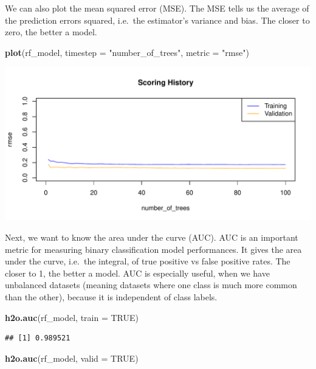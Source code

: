 \documentclass[]{article}
\newenvironment{Shaded}{\begin{snugshade}}{\end{snugshade}}
\newcommand{\KeywordTok}[1]{\textcolor[rgb]{0.13,0.29,0.53}{\textbf{{#1}}}}
\newcommand{\DataTypeTok}[1]{\textcolor[rgb]{0.13,0.29,0.53}{{#1}}}
\newcommand{\StringTok}[1]{\textcolor[rgb]{0.31,0.60,0.02}{{#1}}}
\newcommand{\OtherTok}[1]{\textcolor[rgb]{0.56,0.35,0.01}{{#1}}}
\newcommand{\NormalTok}[1]{{#1}}
\begin{document}
We can also plot the mean squared error (MSE). The MSE tells us the
average of the prediction errors squared, i.e.~the estimator's variance
and bias. The closer to zero, the better a model.

\begin{Shaded}
\begin{Highlighting}[]
\KeywordTok{plot}\NormalTok{(rf_model,}
     \DataTypeTok{timestep =} \StringTok{"number_of_trees"}\NormalTok{,}
     \DataTypeTok{metric =} \StringTok{"rmse"}\NormalTok{)}
\end{Highlighting}
\end{Shaded}

\begin{center}\includegraphics{webinar_code_files/figure-latex/unnamed-chunk-48-1} \end{center}

Next, we want to know the area under the curve (AUC). AUC is an
important metric for measuring binary classification model performances.
It gives the area under the curve, i.e.~the integral, of true positive
vs false positive rates. The closer to 1, the better a model. AUC is
especially useful, when we have unbalanced datasets (meaning datasets
where one class is much more common than the other), because it is
independent of class labels.

\begin{Shaded}
\begin{Highlighting}[]
\KeywordTok{h2o.auc}\NormalTok{(rf_model, }\DataTypeTok{train =} \OtherTok{TRUE}\NormalTok{)}
\end{Highlighting}
\end{Shaded}

\begin{verbatim}
## [1] 0.989521
\end{verbatim}

\begin{Shaded}
\begin{Highlighting}[]
\KeywordTok{h2o.auc}\NormalTok{(rf_model, }\DataTypeTok{valid =} \OtherTok{TRUE}\NormalTok{)}
\end{Highlighting}
\end{Shaded}
\end{document}
